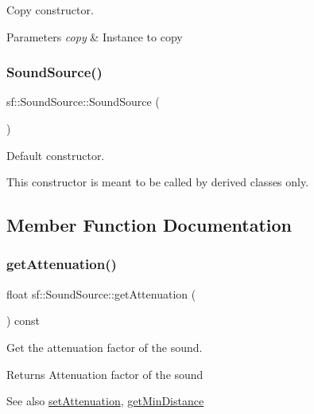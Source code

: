 Copy constructor. 


\begin{DoxyParams}{Parameters}
{\em copy} & Instance to copy \\
\hline
\end{DoxyParams}
\mbox{\label{classsf_1_1_sound_source_aefa4bd4460f387d81a0637d293979436}} 
\subsubsection{\texorpdfstring{Sound\+Source()}{SoundSource()}\hspace{0.1cm}{\footnotesize\ttfamily [2/2]}}
{\footnotesize\ttfamily sf\+::\+Sound\+Source\+::\+Sound\+Source (\begin{DoxyParamCaption}{ }\end{DoxyParamCaption})\hspace{0.3cm}{\ttfamily [protected]}}



Default constructor. 

This constructor is meant to be called by derived classes only. 

\subsection{Member Function Documentation}
\mbox{\label{classsf_1_1_sound_source_a8ad7dafb4f1b4afbc638cebe24f48cc9}} 
\subsubsection{\texorpdfstring{get\+Attenuation()}{getAttenuation()}}
{\footnotesize\ttfamily float sf\+::\+Sound\+Source\+::get\+Attenuation (\begin{DoxyParamCaption}{ }\end{DoxyParamCaption}) const}



Get the attenuation factor of the sound. 

\begin{DoxyReturn}{Returns}
Attenuation factor of the sound
\end{DoxyReturn}
\begin{DoxySeeAlso}{See also}
\hyperlink{classsf_1_1_sound_source_aa2adff44cd2f8b4e3c7315d7c2a45626}{set\+Attenuation}, \hyperlink{classsf_1_1_sound_source_a605ca7f359ec1c36fcccdcd4696562ac}{get\+Min\+Distance} 
\end{DoxySeeAlso}
\mbox{\label{classsf_1_1_sound_source_a605ca7f359ec1c36fcccdcd4696562ac}} 
